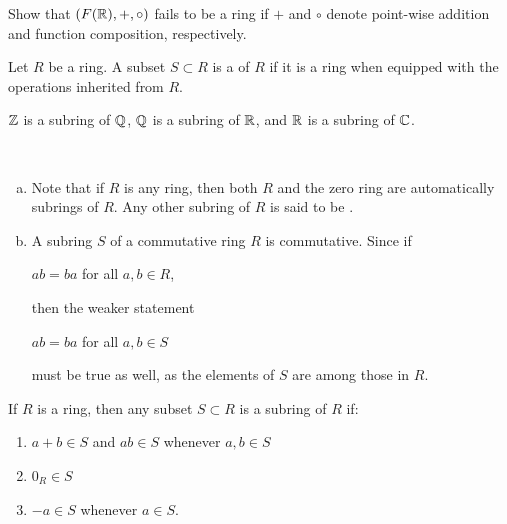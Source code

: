 \documentclass[11pt,fleqn,dvipsnames,usenames]{article}
\begin{document}
%
\begin{exercise}
Show that $(F(\mathbb{R}),+,\circ)$ fails to be a ring if $+$ and $\circ$ denote point-wise addition and function composition, respectively.
\end{exercise}
%
\begin{definition}
Let $R$ be a ring.  A subset $S\subset R$ is a  of $R$ if it is a ring when equipped with the operations inherited from $R$.
\end{definition}
%
\begin{example}
$\mathbb{Z}$ is a subring of $\mathbb{Q}$, $\mathbb{Q}$ is a subring of $\mathbb{R}$, and $\mathbb{R}$ is a subring of $\mathbb{C}$.
\end{example}
%
\begin{remarks}~
\begin{enumerate}[(a)]
\item Note that if $R$ is any ring, then both $R$ and the zero ring are automatically subrings of $R$.  Any other subring of $R$ is said to be .
\item A subring $S$ of a commutative ring $R$ is commutative.  Since if
\begin{center}
$ab = ba$ for all $a,b\in R$,
\end{center}
then the weaker statement
\begin{center}
$ab = ba$ for all $a,b\in S$
\end{center}
must be true as well, as the elements of $S$ are among those in $R$.
\end{enumerate}
\end{remarks}
%
\begin{theorem}\label{subringcriterion}
If $R$ is a ring, then any subset $S\subset R$ is a subring of $R$ if:
\begin{enumerate}[(1)]
\item $a+b\in S$ and $ab\in S$ whenever $a,b\in S$
\item $0_{R}\in S$
\item $-a\in S$ whenever $a\in S$.
\end{enumerate}
\end{theorem}
%
\end{document}
